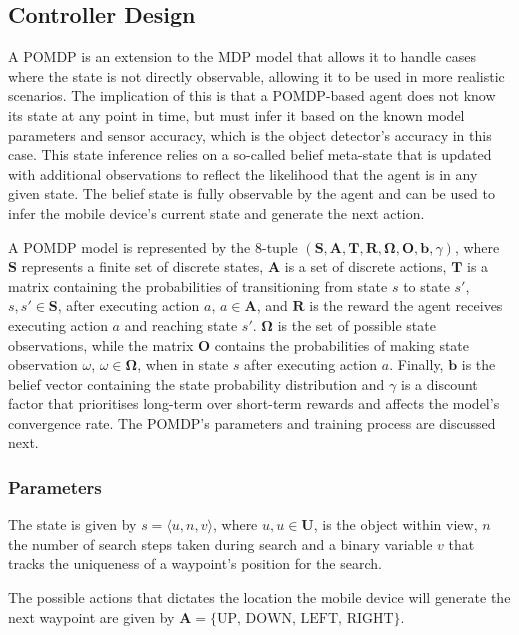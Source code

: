 \documentclass[runningheads]{llncs}
\begin{document}
\subsection{Controller Design}

A POMDP is an extension to the MDP model that allows it to handle cases where the state is not directly observable, allowing it to be used in more realistic scenarios. 
The implication of this is that a POMDP-based agent does not know its state at any point in time, but must infer it based on the known model parameters and sensor accuracy, which is the object detector's accuracy in this case.
This state inference relies on a so-called belief meta-state that is updated with additional observations to reflect the likelihood that the agent is in any given state.
The belief state is fully observable by the agent and can be used to infer the mobile device's current state and generate the next action.

A POMDP model is represented by the 8-tuple $(\mathbf{S}, \mathbf{A}, \mathbf{T}, \mathbf{R}, \mathbf{\Omega}, \mathbf{O}, \mathbf{b}, \gamma)$, where $\mathbf{S}$ represents a finite set of discrete states, $\mathbf{A}$ is a set of discrete actions, $\mathbf{T}$ is a matrix containing the probabilities of transitioning from state $s$ to state $s'$, $s, s' \in \mathbf{S}$, after executing action $a$, $a \in \mathbf{A}$, and $\mathbf{R}$ is the reward the agent receives executing action $a$ and reaching state $s'$.
$\mathbf{\Omega}$ is the set of possible state observations, while the matrix $\mathbf{O}$ contains the probabilities of making state observation $\omega$, $\omega \in \mathbf{\Omega}$, when in state $s$ after executing action $a$.
Finally, $\mathbf{b}$ is the belief vector containing the state probability distribution and $\gamma$ is a discount factor that prioritises long-term over short-term rewards and affects the model's convergence rate. 
The POMDP's parameters and training process are discussed next. 

\subsubsection{Parameters}

The state is given by $s = \langle u, n, v \rangle$, where $u, u\in\mathbf{U}$, is the object within view, $n$ the number of search steps taken during search and a binary variable $v$ that tracks the uniqueness of a waypoint's position for the search.

The possible actions that dictates the location the mobile device will generate the next waypoint are given by $\mathbf{A} = \{ \textrm{UP, DOWN, LEFT, RIGHT} \}$.
\end{document}
